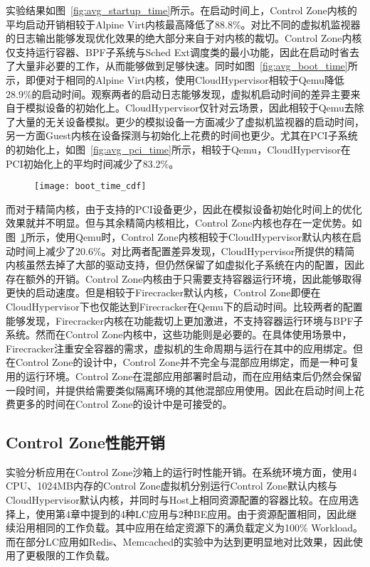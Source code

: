 实验结果如图~\ref{fig:avg_startup_time}所示。在启动时间上，Control Zone内核的平均启动开销相较于Alpine Virt内核最高降低了88.8\%。对比不同的虚拟机监视器的日志输出能够发现优化效果的绝大部分来自于对内核的裁切。Control Zone内核仅支持运行容器、BPF子系统与Sched Ext调度类的最小功能，因此在启动时省去了大量非必要的工作，从而能够做到足够快速。同时如图~\ref{fig:avg_boot_time}所示，即便对于相同的Alpine Virt内核，使用CloudHypervisor相较于Qemu降低28.9\%的启动时间。观察两者的启动日志能够发现，虚拟机启动时间的差异主要来自于模拟设备的初始化上。CloudHypervisor仅针对云场景，因此相较于Qemu去除了大量的无关设备模拟。更少的模拟设备一方面减少了虚拟机监视器的启动时间，另一方面Guest内核在设备探测与初始化上花费的时间也更少。尤其在PCI子系统的初始化上，如图~\ref{fig:avg_pci_time}所示，相较于Qemu，CloudHypervisor在PCI初始化上的平均时间减少了83.2\%。

\begin{figure}[!htbp]
    \centering
    \texttt{[image: boot\_time\_cdf]}
    \label{fig:boot_time_cdf}
\end{figure}

而对于精简内核，由于支持的PCI设备更少，因此在模拟设备初始化时间上的优化效果就并不明显。但与其余精简内核相比，Control Zone内核也存在一定优势。如图~\ref{fig:boot_time_cdf}所示，使用Qemu时，Control Zone内核相较于CloudHypervisor默认内核在启动时间上减少了20.6\%。对比两者配置差异发现，CloudHypervisor所提供的精简内核虽然去掉了大部的驱动支持，但仍然保留了如虚拟化子系统在内的配置，因此存在额外的开销。Control Zone内核由于只需要支持容器运行环境，因此能够取得更快的启动速度。但是相较于Firecracker默认内核，Control Zone即便在CloudHypervisor下也仅能达到Firecracker在Qemu下的启动时间。比较两者的配置能够发现，Firecracker内核在功能裁切上更加激进，不支持容器运行环境与BPF子系统。然而在Control Zone内核中，这些功能则是必要的。在具体使用场景中，Firecracker注重安全容器的需求，虚拟机的生命周期与运行在其中的应用绑定。但在Control Zone的设计中，Control Zone并不完全与混部应用绑定，而是一种可复用的运行环境。Control Zone在混部应用部署时启动，而在应用结束后仍然会保留一段时间，并提供给需要类似隔离环境的其他混部应用使用。因此在启动时间上花费更多的时间在Control Zone的设计中是可接受的。

\subsection{Control Zone性能开销}

实验分析应用在Control Zone沙箱上的运行时性能开销。在系统环境方面，使用4 CPU、1024MB内存的Control Zone虚拟机分别运行Control Zone默认内核与CloudHypervisor默认内核，并同时与Host上相同资源配置的容器比较。在应用选择上，使用第4章中提到的4种LC应用与2种BE应用。由于资源配置相同，因此继续沿用相同的工作负载。其中应用在给定资源下的满负载定义为100\% Workload。而在部分LC应用如Redis、Memcached的实验中为达到更明显地对比效果，因此使用了更极限的工作负载。

